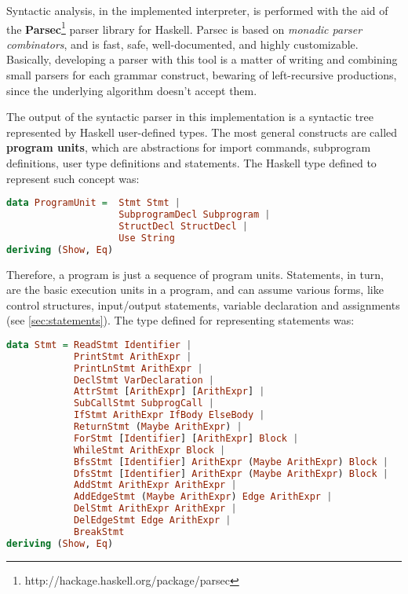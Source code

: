 Syntactic analysis, in the implemented interpreter, is performed
with the aid of the \textbf{Parsec}\footnote{http://hackage.haskell.org/package/parsec} 
parser library for Haskell.
Parsec is based on \emph{monadic parser combinators}, and is
fast, safe, well-documented, and highly customizable. Basically,
developing a parser with this tool is a matter of writing and combining small parsers
for each grammar construct, bewaring of left-recursive
productions, since the underlying algorithm doesn't 
accept them.

The output of the syntactic parser in this implementation is a syntactic tree
represented by Haskell user-defined types. The most general constructs are called
\textbf{program units}, which are abstractions for import commands, subprogram definitions,
user type definitions and statements. The Haskell type defined to represent such
concept was:

\begin{lstlisting}[language=Haskell,basicstyle=\footnotesize]
data ProgramUnit =  Stmt Stmt | 
                    SubprogramDecl Subprogram |
                    StructDecl StructDecl |
                    Use String 
deriving (Show, Eq)
\end{lstlisting}

Therefore, a program is just a sequence of program units. Statements, in turn,
are the basic execution units in a program, and can assume various forms,
like control structures, input/output statements, variable declaration and
assignments (see \autoref{sec:statements}). The type defined for representing statements was:

\begin{lstlisting}[language=Haskell,basicstyle=\footnotesize]
data Stmt = ReadStmt Identifier | 
            PrintStmt ArithExpr | 
            PrintLnStmt ArithExpr | 
            DeclStmt VarDeclaration | 
            AttrStmt [ArithExpr] [ArithExpr] |
            SubCallStmt SubprogCall |
            IfStmt ArithExpr IfBody ElseBody |
            ReturnStmt (Maybe ArithExpr) |
            ForStmt [Identifier] [ArithExpr] Block |
            WhileStmt ArithExpr Block |
            BfsStmt [Identifier] ArithExpr (Maybe ArithExpr) Block |
            DfsStmt [Identifier] ArithExpr (Maybe ArithExpr) Block |
            AddStmt ArithExpr ArithExpr |
            AddEdgeStmt (Maybe ArithExpr) Edge ArithExpr |
            DelStmt ArithExpr ArithExpr |
            DelEdgeStmt Edge ArithExpr |
            BreakStmt 
deriving (Show, Eq) 
\end{lstlisting}

